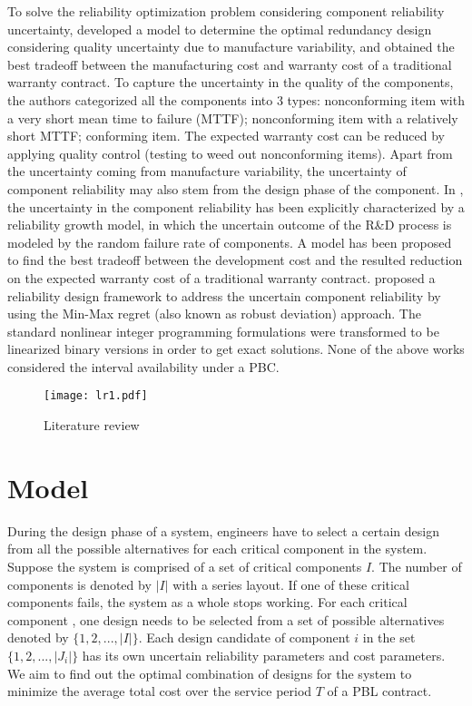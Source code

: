 \documentclass[preprint,12pt]{elsarticle}
\begin{document}
To solve the reliability optimization problem considering component reliability uncertainty, \citet{Murthy1998} developed a model to determine the optimal redundancy design considering quality uncertainty due to manufacture variability, and obtained the best tradeoff between the manufacturing cost and warranty cost of a traditional warranty contract. To capture the uncertainty in the quality of the components, the authors categorized all the components into 3 types: nonconforming item with a very short mean time to failure (MTTF); nonconforming item with a relatively short MTTF; conforming item. The expected warranty cost can be reduced by applying quality control (testing to weed out nonconforming items). Apart from the uncertainty coming from manufacture variability, the uncertainty of component reliability may also stem from the design phase of the component. In \citet{Murthy2003}, the uncertainty in the component reliability has been explicitly characterized by a reliability growth model, in which the uncertain outcome of the R\&D process is modeled by the random failure rate of components. A model has been proposed to find the best tradeoff between the development cost and the resulted reduction on the expected warranty cost of a traditional warranty contract. \citet{Feizollahi} proposed a reliability design framework to address the uncertain component reliability by using the Min-Max regret (also known as robust deviation) approach. The standard nonlinear integer programming formulations were transformed to be linearized binary versions in order to get exact solutions. None of the above works considered the interval availability under a PBC.

\begin{figure}
\centering
\texttt{[image: lr1.pdf]}
 \caption{Literature review}
 \label{fig:literature}
\end{figure}

\section{Model}
During the design phase of a system, engineers have to select a certain design from all the possible alternatives for each critical component in the system. Suppose the system is comprised of a set of critical components $I$. The number of components is denoted by $\lvert I \rvert$ with a series layout. If one of these critical components fails, the system as a whole stops working. For each critical component , one design needs to be selected from a set of possible alternatives denoted by $\{1,2,...,\lvert I \rvert \}$. Each design candidate of component $i$ in the set $\{1,2,...,\lvert J_{i}\rvert\}$ has its own uncertain reliability parameters and cost parameters. We aim to find out the optimal combination of designs for the system to minimize the average total cost over the service period $T$ of a PBL contract.
\end{document}
